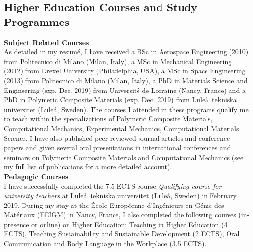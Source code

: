 \documentclass[
  a4paper, 
]{fortysecondscv}
\begin{document}
\subsection{Higher Education Courses and Study Programmes}
\textbf{Subject Related Courses}\\
As detailed in my resum\'e, I have received a BSc in Aerospace Engineering (2010) from Politecnico di Milano (Milan, Italy), a MSc in Mechanical Engineering (2012) from Drexel University (Philadelphia, USA), a MSc in Space Engineering (2013) from Politecnico di Milano (Milan, Italy), a PhD in Materials Science and Engineering (exp. Dec. 2019) from Universit\'e de Lorraine (Nancy, France) and a PhD in Polymeric Composite Materials (exp. Dec. 2019) from Lule\aa\ tekniska universitet (Lule\aa, Sweden). The courses I attended in these programs qualify me to teach within the specializations of Polymeric Composite Materials, Computational Mechanics, Experimental Mechanics, Computational Materials Science. I have also published peer-reviewed journal articles and conference papers and given several oral presentations in international conferences and seminars on Polymeric Composite Materials and Computational Mechanics (see my full list of publications for a more detailed account).\\[2pt]
\textbf{Pedagogic Courses}\\
I have successfully completed the 7.5 ECTS course \emph{Qualifying course for university teachers} at Lule\aa\ tekniska universitet (Lule\aa, Sweden) in February 2019. During my stay at the \'Ecole Europ\'eenne d'Ing\'enieurs en G\'enie des Mat\'eriaux (EEIGM) in Nancy, France, I also completed the following courses (in-presence or online) on Higher Education: Teaching in Higher Education (4 ECTS), Teaching Sustainability and Sustainable Development (2 ECTS), Oral Communication and Body Language in the Workplace (3.5 ECTS).
\end{document}
